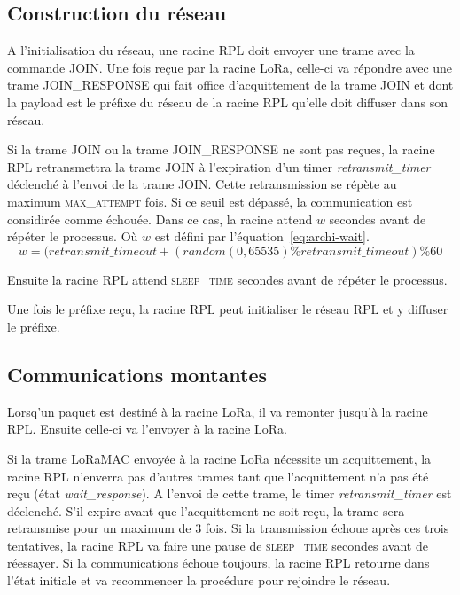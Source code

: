 \subsection*{Construction du réseau}
    A l'initialisation du réseau, une racine RPL doit envoyer une trame avec la commande JOIN. Une fois reçue par la racine LoRa, celle-ci va répondre avec une trame JOIN\_RESPONSE qui fait office d'acquittement de la trame JOIN et dont la payload est le préfixe du réseau de la racine RPL qu'elle doit diffuser dans son réseau.

    Si la trame JOIN ou la trame JOIN\_RESPONSE ne sont pas reçues, la racine RPL retransmettra la trame JOIN à l'expiration d'un timer \textit{retransmit\_timer} déclenché à l'envoi de la trame JOIN. Cette retransmission se répète au maximum \textsc{max\_attempt} fois. Si ce seuil est dépassé, la communication est considirée comme échouée. Dans ce cas, la racine attend $w$ secondes avant de répéter le processus. Où $w$ est défini par l'équation~\ref{eq:archi-wait}.
    \begin{equation}\label{eq:archi-wait}
        w=(retransmit\_timeout+(random(0,65535) \% retransmit\_timeout)\%60
    \end{equation}
    
    Ensuite la racine RPL attend \textsc{sleep\_time} secondes avant de répéter le processus.

    Une fois le préfixe reçu, la racine RPL peut initialiser le réseau RPL et y diffuser le préfixe.

\subsection*{Communications montantes}
    Lorsq'un paquet est destiné à la racine LoRa, il va remonter jusqu'à la racine RPL. Ensuite celle-ci va l'envoyer à la racine LoRa.

    Si la trame LoRaMAC envoyée à la racine LoRa nécessite un acquittement, la racine RPL n'enverra pas d'autres trames tant que l'acquittement n'a pas été reçu (état \textit{wait\_response}).
    A l'envoi de cette trame, le timer \textit{retransmit\_timer} est déclenché. S'il expire avant que l'acquittement ne soit reçu, la trame sera retransmise pour un maximum de 3 fois. Si la transmission échoue après ces trois tentatives, la racine RPL va faire une pause de \textsc{sleep\_time} secondes avant de réessayer. Si la communications échoue toujours, la racine RPL retourne dans l'état initiale et va recommencer la procédure pour rejoindre le réseau.


